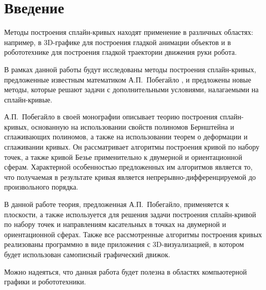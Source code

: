 \chapter*{Введение}

Методы построения сплайн-кривых находят применение в различных областях: например, в 3D-графике для построения гладкой
анимации объектов и в робототехнике для построения гладкой траектории движения руки робота.

В рамках данной работы будут исследованы методы построения сплайн-кривых, предложенные известным математиком
А.П.~Побегайло \cite{pobegaylo}, и предложены новые методы, которые решают задачи с дополнительными условиями,
налагаемыми на сплайн-кривые.

А.П.~Побегайло в своей монографии описывает теорию построения сплайн-кривых, основанную на
использовании свойств полиномов Бернштейна и сглаживающих полиномов, а также на использовании теорем о деформации и
сглаживании кривых. Он рассматривает алгоритмы построения кривой по набору точек, а также кривой Безье применительно
к двумерной и ориентационной сферам. Характерной особенностью предложенных им алгоритмов является то, что получаемая
в результате кривая является непрерывно-дифференцируемой до произвольного порядка.

В данной работе теория, предложенная А.П.~Побегайло, применяется к плоскости, а также используется для
решения задачи построения сплайн-кривой по набору точек и направлениям касательных в точках на двумерной и
ориентационной сферах. Также все рассмотренные алгоритмы построения кривых реализованы программно в виде
приложения с 3D-визуализацией, в котором будет использован самописный графический движок.

Можно надеяться, что данная работа будет полезна в областях компьютерной графики и робототехники.
